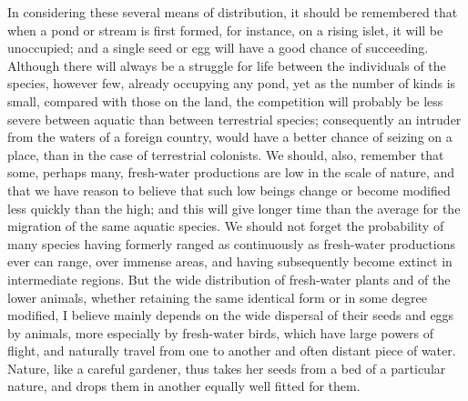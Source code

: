 \indent In considering these several means of distribution, it should be remembered that when a pond or stream is first formed, for instance, on a rising islet, it will be unoccupied; and a single seed or egg will have a good chance of succeeding. Although there will always be a struggle for life between the individuals of the species, however few, already occupying any pond, yet as the number of kinds is small, compared with those on the land, the competition will probably be less severe between aquatic than between terrestrial species; consequently an intruder from the waters of a foreign country, would have a better chance of seizing on a place, than in the case of terrestrial colonists. We should, also, remember that some, perhaps many, fresh-water productions are low in the scale of nature, and that we have reason to believe that such low beings change or become modified less quickly than the high; and this will give longer time than the average for the migration of the same aquatic species. We should not forget the probability of many species having formerly ranged as continuously as fresh-water productions ever can range, over immense areas, and having subsequently become extinct in intermediate regions. But the wide distribution of fresh-water plants and of the lower animals, whether retaining the same identical form or in some degree modified, I believe mainly depends on the wide dispersal of their seeds and eggs by animals, more especially by fresh-water birds, which have large powers of flight, and naturally travel from one to another and often distant piece of water. Nature, like a careful gardener, thus takes her seeds from a bed of a particular nature, and drops them in another equally well fitted for them.~\\

